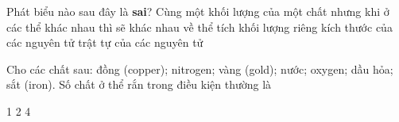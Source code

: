 \begin{ex}%
	Phát biểu nào sau đây là \textbf{sai}? Cùng một khối lượng của một chất nhưng khi ở các thể khác nhau thì sẽ khác nhau về
	\choice
	{thể tích}
	{khối lượng riêng}
	{\True kích thước của các nguyên tử}
	{trật tự của các nguyên tử}
	
	\end{ex}
	\begin{ex}%
		Cho các chất sau: đồng (copper); nitrogen; vàng (gold); nước; oxygen; dầu hỏa; sắt (iron). Số chất ở thể rắn trong điều kiện thường là
		
		\choice
		{1}
		{2}
		{}
		{4}
		\end{ex}
